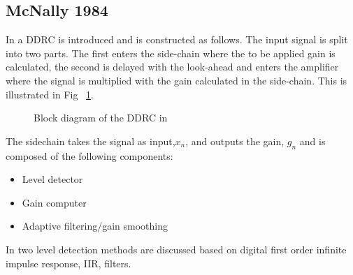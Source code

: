 \documentclass[../main2.tex]{subfiles}
\providecommand{\rootdir}{..}
\begin{document}
\subsection{McNally 1984}
In \cite{mcnally1984dynamic} a DDRC is introduced and is constructed as follows. The input signal is split into two parts. The first enters the side-chain where the to be applied gain is calculated, the second is delayed with the look-ahead and enters the amplifier where the signal is multiplied with the gain calculated in the side-chain. This is illustrated in Fig ~\ref{fig:block_mcnally_theory1}. %
\begin{figure}
\centerline{}
\caption{Block diagram of the DDRC in \cite{mcnally1984dynamic}}
\label{fig:block_mcnally_theory1}
\end{figure}

The sidechain takes the signal as input,$x_n$, and outputs the gain, $g_n$ and is composed of the following components:%
\begin{itemize}
\item{Level detector}
\item{Gain computer}
\item{Adaptive filtering/gain smoothing}
\end{itemize}
In \cite{mcnally1984dynamic} two level detection methods are discussed based on digital first order infinite impulse response, IIR, filters.
\end{document}
